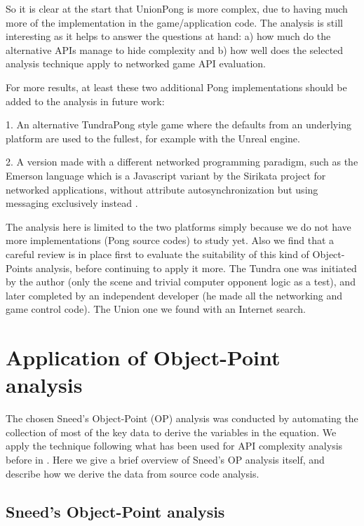 \documentclass[conference]{IEEEtran}
\begin{document}
So it is clear at the start that UnionPong is more complex, due to
having much more of the implementation in the game/application
code. The analysis is still interesting as it helps to answer the
questions at hand: a) how much do the alternative APIs manage to hide
complexity and b) how well does the selected analysis technique apply
to networked game API evaluation.

For more results, at least these two additional Pong implementations
should be added to the analysis in future work:

1. An alternative TundraPong style game where the defaults from an
underlying platform are used to the fullest, for example with the
Unreal engine.

2. A version made with a different networked programming paradigm,
such as the Emerson language which is a Javascript variant by the
Sirikata project for networked applications, without attribute
autosynchronization but using messaging exclusively instead
\cite{sirikata-scripting}.

The analysis here is limited to the two platforms simply because we do
not have more implementations (Pong source codes) to study yet. Also
we find that a careful review is in place first to evaluate the
suitability of this kind of Object-Points analysis, before continuing
to apply it more. The Tundra one was initiated by the author (only the
scene and trivial computer opponent logic as a test), and later
completed by an independent developer (he made all the networking and
game control code). The Union one we found with an Internet search.


\section{Application of Object-Point analysis%
  \label{application-of-object-point-analysis}%
}

The chosen Sneed's Object-Point (OP) analysis was conducted by
automating the collection of most of the key data to derive the
variables in the equation. We apply the technique following what has
been used for API complexity analysis before in
\cite{api-complexity-analysis}. Here we give a brief overview of Sneed's
OP analysis itself, and describe how we derive the data from source
code analysis.


\subsection{Sneed's Object-Point analysis%
  \label{sneed-s-object-point-analysis}%
}
\end{document}
